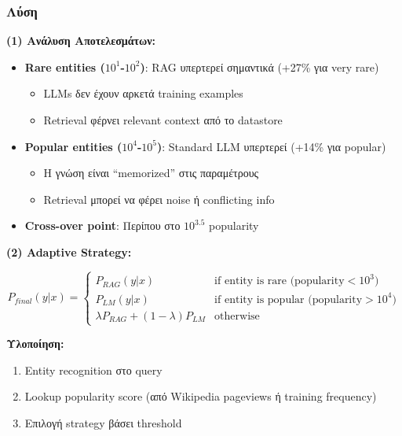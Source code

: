 \subsubsection*{Λύση}

\textbf{(1) Ανάλυση Αποτελεσμάτων:}

\begin{itemize}
    \item \textbf{Rare entities ($10^1$-$10^2$)}: RAG υπερτερεί σημαντικά (+27\% για very rare)
    \begin{itemize}
        \item LLMs δεν έχουν αρκετά training examples
        \item Retrieval φέρνει relevant context από το datastore
    \end{itemize}

    \item \textbf{Popular entities ($10^4$-$10^5$)}: Standard LLM υπερτερεί (+14\% για popular)
    \begin{itemize}
        \item Η γνώση είναι ``memorized'' στις παραμέτρους
        \item Retrieval μπορεί να φέρει noise ή conflicting info
    \end{itemize}

    \item \textbf{Cross-over point}: Περίπου στο $10^{3.5}$ popularity
\end{itemize}

\textbf{(2) Adaptive Strategy:}

$$P_{final}(y|x) = \begin{cases}
P_{RAG}(y|x) & \text{if entity is rare (popularity} < 10^3\text{)} \\
P_{LM}(y|x) & \text{if entity is popular (popularity} > 10^4\text{)} \\
\lambda P_{RAG} + (1-\lambda) P_{LM} & \text{otherwise}
\end{cases}$$

\textbf{Υλοποίηση:}
\begin{enumerate}
    \item Entity recognition στο query
    \item Lookup popularity score (από Wikipedia pageviews ή training frequency)
    \item Επιλογή strategy βάσει threshold
\end{enumerate}

\begin{center}
\end{center}

